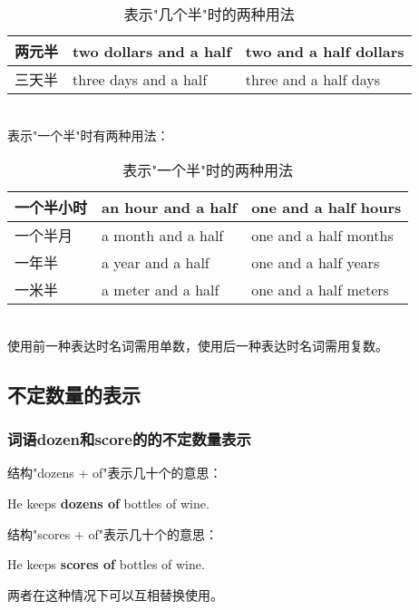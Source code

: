 \documentclass[UTF8]{ctexart}
\newcommand{\littf}[1]{{\hspace{3pt}\ttfamily #1}}
\begin{document}
    \begin{table}[h!]
        \begin{center}
            \ttfamily
            \begin{tabular}{p{60pt}|p{130pt}|p{130pt}}
                \hline
                两元半&two dollars and a half&two and a half dollars\\ \hline
                三天半&three days and a half&three and a half days\\ \hline
            \end{tabular}
            \rmfamily
            \caption{表示\littf{"\hspace{0pt}几个半"}时的两种用法}
        \end{center}
    \end{table}\\
    表示\littf{"\hspace{0pt}一个半"}时有两种用法：\vspace{5pt}
    \begin{table}[h!]
        \begin{center}
            \ttfamily
            \begin{tabular}{p{60pt}|p{130pt}|p{130pt}}
                \hline
                一个半小时&an hour and a half&one and a half hours\\ \hline
                一个半月&a month and a half&one and a half months\\ \hline
                一年半&a year and a half&one and a half years\\ \hline
                一米半&a meter and a half&one and a half meters\\ \hline
            \end{tabular}
            \rmfamily
            \caption{表示\littf{"\hspace{0pt}一个半"}时的两种用法}
        \end{center}
    \end{table}\\
    使用前一种表达时名词需用单数，使用后一种表达时名词需用复数。

\newpage

\subsection{不定数量的表示}

\subsubsection{词语\littf{dozen}和\littf{score}的的不定数量表示}
    结构\littf{"dozens + of"}表示几十个的意思：
    \begin{center}
        \large\ttfamily
        He keeps \textbf{dozens of} bottles of wine.\\[6mm]
    \end{center}
    结构\littf{"scores + of"}表示几十个的意思：
    \begin{center}
        \large\ttfamily
        He keeps \textbf{scores of} bottles of wine.\\[6mm]
    \end{center}
    两者在这种情况下可以互相替换使用。\\
\end{document}

